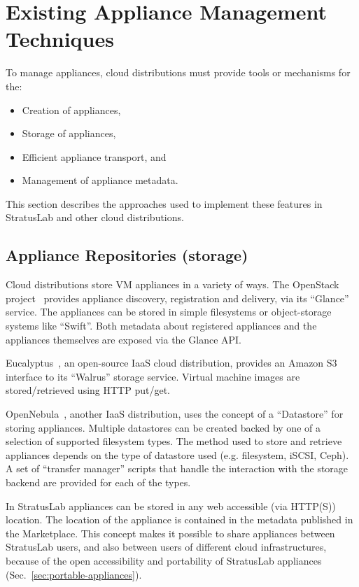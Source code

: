 \section{Existing Appliance Management Techniques}
\label{sec:other-approaches}

To manage appliances, cloud distributions must provide tools or
mechanisms for the:
\begin{itemize}
\item Creation of appliances,
\item Storage of appliances,
\item Efficient appliance transport, and
\item Management of appliance metadata.
\end{itemize}
This section describes the approaches used to implement these features
in StratusLab and other cloud distributions.

\subsection{Appliance Repositories (storage)}

Cloud distributions store VM appliances in a variety of ways. 
The OpenStack project~\cite{openstack} provides appliance discovery, registration and delivery, 
via its ``Glance'' service. The appliances can be stored in simple filesystems or 
object-storage systems like ``Swift''\@. Both metadata about registered appliances 
and the appliances themselves are exposed via the Glance API\@.

Eucalyptus~\cite{eucalyptus}, an open-source IaaS cloud distribution, provides an Amazon S3 interface to its 
``Walrus'' storage service. Virtual machine images are stored/retrieved using HTTP put/get.

OpenNebula~\cite{opennebula}, another IaaS distribution, uses the concept of a ``Datastore'' for storing appliances. 
Multiple datastores can be created backed by one of a selection of supported filesystem types. 
The method used to store and retrieve appliances depends on the type of datastore used (e.g. filesystem, 
iSCSI, Ceph). A set of ``transfer manager'' scripts that handle the interaction with the storage backend are provided for 
each of the types.

In StratusLab appliances can be stored in any web accessible (via HTTP(S)) location. The location of the appliance 
is contained in the metadata published in the Marketplace\@. This concept makes it possible 
to share appliances between StratusLab users, and also between users of different cloud 
infrastructures, because of the open accessibility and portability of StratusLab appliances (Sec.~\ref{sec:portable-appliances}). 


